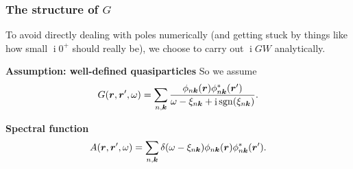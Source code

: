 \documentclass[t]{beamer}
\DeclareMathOperator{\ii}{i}
\DeclareMathOperator{\sgn}{sgn}
\begin{document}
\begin{frame}
\frametitle{The structure of $G$}

To avoid directly dealing with poles numerically 
(and getting stuck by things like how small $\ii 0^+$ should really be), 
we choose to carry out $\ii GW$ analytically. 

\textbf{Assumption: well-defined quasiparticles} So we assume 
\begin{equation}
    G(\vb*{r}, \vb*{r}', \omega) 
    = \sum_{n, \vb*{k}} \frac{
        \phi_{n \vb*{k}}(\vb*{r}) \phi_{n \vb*{k}}^*(\vb*{r}')
    }{
        \omega - \xi_{n \vb*{k}} + \ii \sgn(\xi_{n \vb*{k}})
    }.
\end{equation}

\textbf{Spectral function} \begin{equation}
    A(\vb*{r}, \vb*{r}', \omega)
    = \sum_{n, \vb*{k}} \delta(\omega - \xi_{n \vb*{k}})
    \phi_{n \vb*{k}}(\vb*{r}) \phi^*_{n \vb*{k}}(\vb*{r}').
\end{equation}


\end{frame}
\end{document}
